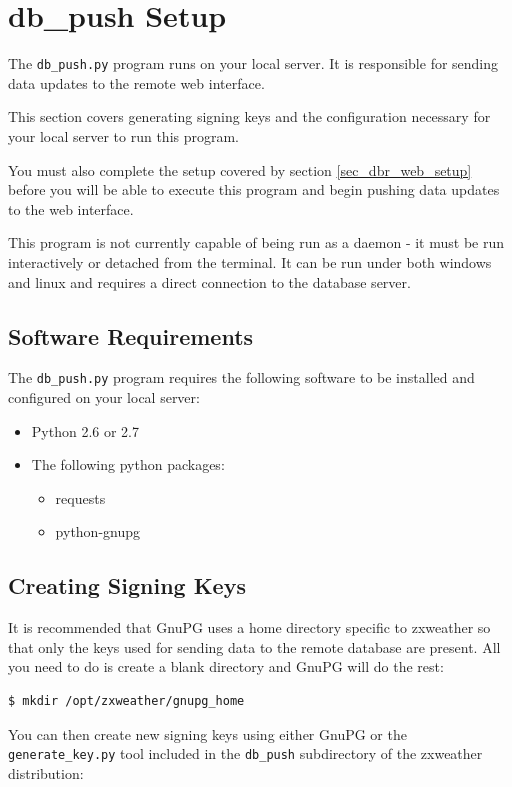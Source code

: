 \documentclass[a4paper,10pt,draft]{book}
\begin{document}
\section{db\_push Setup}
The \verb|db_push.py| program runs on your local server. It is responsible for sending data updates to the remote web interface. 

This section covers generating signing keys and the configuration necessary for your local server to run this program.

You must also complete the setup covered by section \ref{sec_dbr_web_setup} before you will be able to execute this program and begin pushing data updates to the web interface.

This program is not currently capable of being run as a daemon - it must be run interactively or detached from the terminal. It can be run under both windows and linux and requires a direct connection to the database server.

\subsection{Software Requirements}
The \verb|db_push.py| program requires the following software to be installed and configured on your local server:
\begin{itemize}
\item Python 2.6 or 2.7
\item The following python packages:
\begin{itemize}
\item requests
\item python-gnupg
\end{itemize}
\end{itemize}

\subsection{Creating Signing Keys}
\label{subsec_dbr_create_keys}

It is recommended that GnuPG uses a home directory specific to zxweather so that only the keys used for sending data to the remote database are present. All you need to do is create a blank directory and GnuPG will do the rest:

\begin{verbatim}
$ mkdir /opt/zxweather/gnupg_home
\end{verbatim}

You can then create new signing keys using either GnuPG or the \verb|generate_key.py| tool included in the \verb|db_push| subdirectory of the zxweather distribution:
\end{document}
